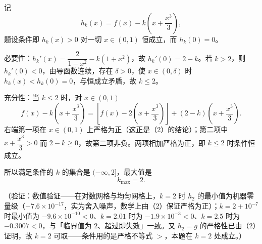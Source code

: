 \begin{answer}

记
\nopagebreak[4]
\[
h_{k}(x)=f(x)-k\left(x+\frac{x^{3}}{3}\right),
\]
题设条件即 \(h_{k}(x)>0\) 对一切 \(x\in(0,1)\) 恒成立，而 \(h_{k}(0)=0\)。

必要性：\(h_{k}'(x)=\dfrac{2}{1-x^{2}}-k(1+x^{2})\)，故 \(h_{k}'(0)=2-k\)。若 \(k>2\)，则 \(h_{k}'(0)<0\)，由导函数连续，存在 \(\delta>0\)，使 \(x\in(0,\delta)\) 时 \(h_{k}(x)<h_{k}(0)=0\)，与恒成立矛盾，故 \(k\leqslant2\)。

充分性：当 \(k\leqslant2\) 时，对 \(x\in(0,1)\)
\nopagebreak[4]
\[
f(x)-k\left(x+\frac{x^{3}}{3}\right)=\left[f(x)-2\left(x+\frac{x^{3}}{3}\right)\right]+(2-k)\left(x+\frac{x^{3}}{3}\right).
\]
右端第一项在 \(x\in(0,1)\) 上严格为正（这正是（2）的结论）；第二项中 \(x+\dfrac{x^{3}}{3}>0\) 而 \(2-k\geqslant0\)，故第二项非负。两项相加严格为正，即 \(k\leqslant2\) 时条件恒成立。

所以满足条件的 \(k\) 的集合是 \((-\infty,2]\)，最大值是
\nopagebreak[4]
\[
k_{\max}=2 .
\]

（验证：数值验证——在对数网格与均匀网格上，\(k=2\) 时 \(h_{2}\) 的最小值为机器零量级（\(-7.6\times10^{-17}\)，实为舍入噪声，数学上由（2）保证严格为正）；\(k=2+10^{-7}\) 时最小值为 \(-9.6\times10^{-10}<0\)、\(k=2.01\) 时为 \(-1.9\times10^{-3}<0\)、\(k=2.5\) 时为 \(-0.3007<0\)，与「临界值为 \(2\)、超过即失效」一致。又 \(h_{2}=g\) 的严格性已由（2）证明，故 \(k=2\) 可取——条件用的是严格不等式 \(>\)，本题在 \(k=2\) 处成立。）




\end{answer}
